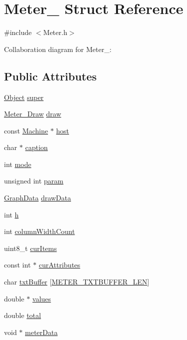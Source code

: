 \hypertarget{structMeter__}{}\section{Meter\+\_\+ Struct Reference}
\label{structMeter__}


{\ttfamily \#include $<$Meter.\+h$>$}



Collaboration diagram for Meter\+\_\+\+:
\subsection*{Public Attributes}
\begin{DoxyCompactItemize}
\item 
\hyperlink{Object_8h_a32b67ad7134cd31b5ec5ed9c6a2d3978}{Object} \hyperlink{structMeter___a5530dd854e537e4d8cea1b2a30274220}{super}
\item 
\hyperlink{Meter_8h_af2bfba1e0c54d7d0dc0511e1805b1725}{Meter\+\_\+\+Draw} \hyperlink{structMeter___a70693e99c82db41cac4c71087406021d}{draw}
\item 
const \hyperlink{Machine_8h_aa3706f95e4706b9d02979efcabb1341d}{Machine} $\ast$ \hyperlink{structMeter___aa827fa608e9c10bee5f8db4cd74a2d52}{host}
\item 
char $\ast$ \hyperlink{structMeter___af99f386ef7cc5a68e324e9224b43eff0}{caption}
\item 
int \hyperlink{structMeter___a001186458a7e6a8ccaaea3dcf4aa11fc}{mode}
\item 
unsigned int \hyperlink{structMeter___ae15c083af90b4ad836f12d13ec186e00}{param}
\item 
\hyperlink{Meter_8h_ab34ea7cb1d5864cd6f66f8de77662147}{Graph\+Data} \hyperlink{structMeter___a7f9022ce2c1a382a06a000dd9ea8896c}{draw\+Data}
\item 
int \hyperlink{structMeter___abbadc9c9277bb3f684638311b4a641fb}{h}
\item 
int \hyperlink{structMeter___a93d329f43e751f94476dc748855f9138}{column\+Width\+Count}
\item 
uint8\+\_\+t \hyperlink{structMeter___a494a763b1c5e88ab906c8c306db8311a}{cur\+Items}
\item 
const int $\ast$ \hyperlink{structMeter___aecd1eb68576cf1cf9faac9c2e24767b0}{cur\+Attributes}
\item 
char \hyperlink{structMeter___a416eb1eb88d529c05363693ee2e4f0a0}{txt\+Buffer} \mbox{[}\hyperlink{Meter_8h_a01af83fd1a469fbecc974543fe070afe}{M\+E\+T\+E\+R\+\_\+\+T\+X\+T\+B\+U\+F\+F\+E\+R\+\_\+\+L\+EN}\mbox{]}
\item 
double $\ast$ \hyperlink{structMeter___a2242de0dc6ce06dd9143a14adcb47ecf}{values}
\item 
double \hyperlink{structMeter___aaa378dc72326e6963468b37b1bf0f75c}{total}
\item 
void $\ast$ \hyperlink{structMeter___ac5fab91567c4a20ba7d9db35804bb4d8}{meter\+Data}
\end{DoxyCompactItemize}


